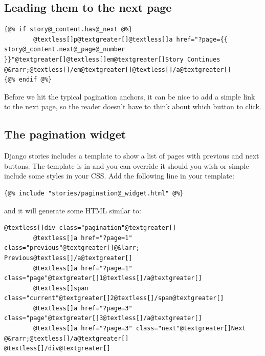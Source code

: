 \documentclass[letterpaper,10pt,english]{manual}
\begin{document}
\subsection{Leading them to the next page}

\begin{Verbatim}[commandchars=@\[\]]
{@% if story@_content.has@_next @%}
        @textless[]p@textgreater[]@textless[]a href="?page={{ story@_content.next@_page@_number }}"@textgreater[]@textless[]em@textgreater[]Story Continues @&rarr;@textless[]/em@textgreater[]@textless[]/a@textgreater[]
{@% endif @%}
\end{Verbatim}

Before we hit the typical pagination anchors, it can be nice to add a simple link to the next page, so the reader doesn't have to think about which button to click.


\subsection{The pagination widget}

Django stories includes a template to show a list of pages with previous and next buttons. The template is in  and you can override it should you wish or simple include some styles in your CSS. Add the following line in your template:

\begin{Verbatim}[commandchars=@\[\]]
{@% include "stories/pagination@_widget.html" @%}
\end{Verbatim}

and it will generate some HTML similar to:

\begin{Verbatim}[commandchars=@\[\]]
@textless[]div class="pagination"@textgreater[]
        @textless[]a href="?page=1" class="previous"@textgreater[]@&larr; Previous@textless[]/a@textgreater[]
        @textless[]a href="?page=1" class="page"@textgreater[]1@textless[]/a@textgreater[]
        @textless[]span class="current"@textgreater[]2@textless[]/span@textgreater[]
        @textless[]a href="?page=3" class="page"@textgreater[]3@textless[]/a@textgreater[]
        @textless[]a href="?page=3" class="next"@textgreater[]Next @&rarr;@textless[]/a@textgreater[]
@textless[]/div@textgreater[]
\end{Verbatim}
\end{document}
